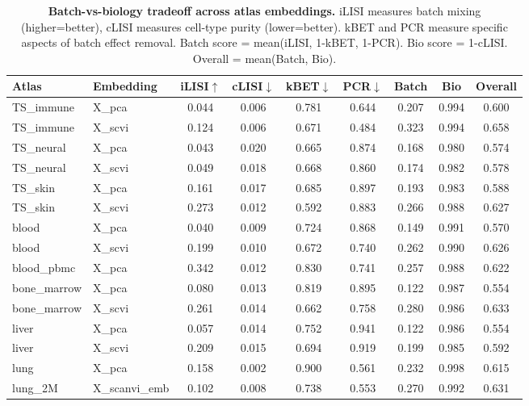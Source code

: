 
\begin{table}[htbp]
\centering
\caption{\textbf{Batch-vs-biology tradeoff across atlas embeddings.}
iLISI measures batch mixing (higher=better), cLISI measures cell-type purity (lower=better).
kBET and PCR measure specific aspects of batch effect removal.
Batch score = mean(iLISI, 1-kBET, 1-PCR). Bio score = 1-cLISI. Overall = mean(Batch, Bio).}
\label{tab:batch_vs_bio}
\small
\begin{tabular}{l l c c c c c c c}
\toprule
\textbf{Atlas} & \textbf{Embedding} & \textbf{iLISI$\uparrow$} & \textbf{cLISI$\downarrow$} & \textbf{kBET$\downarrow$} & \textbf{PCR$\downarrow$} & \textbf{Batch} & \textbf{Bio} & \textbf{Overall} \\
\midrule
TS\_immune & X_pca & 0.044 & 0.006 & 0.781 & 0.644 & 0.207 & 0.994 & 0.600 \\
TS\_immune & X_scvi & 0.124 & 0.006 & 0.671 & 0.484 & 0.323 & 0.994 & 0.658 \\
TS\_neural & X_pca & 0.043 & 0.020 & 0.665 & 0.874 & 0.168 & 0.980 & 0.574 \\
TS\_neural & X_scvi & 0.049 & 0.018 & 0.668 & 0.860 & 0.174 & 0.982 & 0.578 \\
TS\_skin & X_pca & 0.161 & 0.017 & 0.685 & 0.897 & 0.193 & 0.983 & 0.588 \\
TS\_skin & X_scvi & 0.273 & 0.012 & 0.592 & 0.883 & 0.266 & 0.988 & 0.627 \\
blood & X_pca & 0.040 & 0.009 & 0.724 & 0.868 & 0.149 & 0.991 & 0.570 \\
blood & X_scvi & 0.199 & 0.010 & 0.672 & 0.740 & 0.262 & 0.990 & 0.626 \\
blood\_pbmc & X_pca & 0.342 & 0.012 & 0.830 & 0.741 & 0.257 & 0.988 & 0.622 \\
bone\_marrow & X_pca & 0.080 & 0.013 & 0.819 & 0.895 & 0.122 & 0.987 & 0.554 \\
bone\_marrow & X_scvi & 0.261 & 0.014 & 0.662 & 0.758 & 0.280 & 0.986 & 0.633 \\
liver & X_pca & 0.057 & 0.014 & 0.752 & 0.941 & 0.122 & 0.986 & 0.554 \\
liver & X_scvi & 0.209 & 0.015 & 0.694 & 0.919 & 0.199 & 0.985 & 0.592 \\
lung & X_pca & 0.158 & 0.002 & 0.900 & 0.561 & 0.232 & 0.998 & 0.615 \\
lung\_2M & X_scanvi_emb & 0.102 & 0.008 & 0.738 & 0.553 & 0.270 & 0.992 & 0.631 \\
\bottomrule
\end{tabular}
\end{table}
